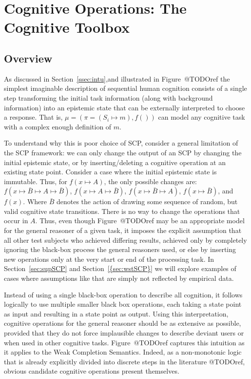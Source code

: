 \chapter{Cognitive Operations: The Cognitive Toolbox} \label{chp:toolbox}
\section{Overview}
As discussed in Section~\ref{ssec:intu},and illustrated in Figure~@TODOref the simplest imaginable description of sequential human cognition consists of a single step transforming the initial task information (along with background information) into an epistemic state that can be externally interpreted to choose a response. That is, $\mu=(\pi=(S_i \longmapsto m),f())$ can model any cognitive task with a complex enough definition of $m$.

To understand why this is poor choice of SCP, consider a general limitation of the SCP framework: we can only change the output of an SCP by changing the initial epistemic state, or by inserting/deleting a cognitive operation at an existing state point. Consider a case where the initial epistemic state is immutable. Thus, for $f(x \longmapsto A)$, the only possible changes are: $f(x \longmapsto \bar{B} \longmapsto A \longmapsto \bar{B})$, $f(x \longmapsto A \longmapsto \bar{B})$, $f(x \longmapsto \bar{B} \longmapsto A)$, $f(x \longmapsto \bar{B})$, and $f(x)$. Where $\bar{B}$ denotes the action of drawing some sequence of random, but valid cognitive state transitions. There is no way to change the operations that occur in $A$. Thus, even though Figure~@TODOref may be an appropriate model for the general reasoner of a given task, it imposes the explicit assumption that all other test subjects who achieved differing results, achieved only by completely ignoring the black-box process the general reasoners used, or else by inserting new operations only at the very start or end of the processing task. In Section~\ref{sec:supSCP} and Section~\ref{{sec:wstSCP}} we will explore examples of cases where assumptions like that are simply not reflected by empirical data. 

Instead of using a single black-box operation to describe all cognition, it follows logically to use multiple smaller black box operations, each taking a state point as input and resulting in a state point as output. Using this interpretation, cognitive operations for the general reasoner should be as extensive as possible, provided that they do not force implausible changes to describe deviant users or when used in other cognitive tasks. Figure~@TODOref captures this intuition as it applies to the Weak Completion Semantics. Indeed, as a non-monotonic logic that is already explicitly divided into discrete steps in the literature @TODOref, obvious candidate cognitive operations present themselves.

